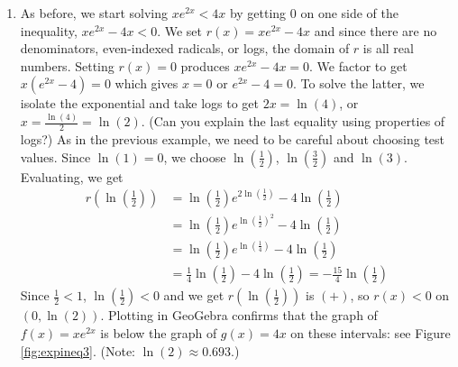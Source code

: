{\begin{enumerate}
{}


\item  As before, we start solving $x e^{2x} < 4x$ by getting $0$ on one side of the inequality, $x e^{2x} - 4x < 0$.   We set $r(x) = xe^{2x} - 4x$ and since there are no denominators, even-indexed radicals, or logs, the domain of $r$ is all real numbers.  Setting $r(x) = 0$  produces $x e^{2x} - 4x  = 0$. We factor to get $x \left(e^{2x} - 4\right)  = 0$ which gives $x=0$ or $e^{2x} - 4 = 0$.  To solve the latter, we isolate the exponential and take logs to get $2x = \ln(4)$, or $x = \frac{\ln(4)}{2} = \ln(2)$.  (Can you explain the last equality using properties of logs?)  As in the previous example, we need to be careful about choosing test values.  Since $\ln(1) = 0$, we choose $\ln\left(\frac{1}{2}\right)$, $\ln\left(\frac{3}{2}\right)$ and $\ln(3)$.  Evaluating, we get 
\begin{align*}
r\left(\ln\left(\frac{1}{2}\right)\right) & =  \ln\left(\frac{1}{2}\right) e^{2\ln\left(\frac{1}{2}\right)} - 4\ln\left(\frac{1}{2}\right)  \\
&=  \ln\left(\frac{1}{2}\right)e^{\ln\left(\frac{1}{2}\right)^2}- 4\ln\left(\frac{1}{2}\right)  \tag*{Power Rule} \\
& =  \ln\left(\frac{1}{2}\right)e^{\ln\left(\frac{1}{4}\right)}- 4\ln\left(\frac{1}{2}\right)  \\
& =  \frac{1}{4}  \ln\left(\frac{1}{2}\right) - 4  \ln\left(\frac{1}{2}\right) =  -\frac{15}{4} \ln\left(\frac{1}{2}\right)
\end{align*}
Since $\frac{1}{2} < 1$, $ \ln\left(\frac{1}{2}\right) < 0$ and we get $r(\ln\left(\frac{1}{2}\right))$ is $(+)$, so $r(x) < 0$ on $(0 ,\ln(2))$.  Plotting in GeoGebra confirms that the graph of $f(x) = x e^{2x} $ is below the graph of $g(x) = 4x$ on these intervals: see Figure \ref{fig:expineq3}. (Note: $\ln(2) \approx 0.693$.)


\end{enumerate}}
